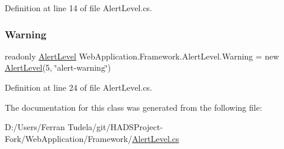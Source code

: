 Definition at line 14 of file Alert\+Level.\+cs.

\mbox{\label{classWebApplication_1_1Framework_1_1AlertLevel_a446058e14c2e46ed2ed3232cb6c6b155}} 
\subsubsection{\texorpdfstring{Warning}{Warning}}
{\footnotesize\ttfamily readonly \mbox{\hyperlink{classWebApplication_1_1Framework_1_1AlertLevel}{Alert\+Level}} Web\+Application.\+Framework.\+Alert\+Level.\+Warning = new \mbox{\hyperlink{classWebApplication_1_1Framework_1_1AlertLevel}{Alert\+Level}}(5, \char`\"{}alert-\/warning\char`\"{})\hspace{0.3cm}{\ttfamily [static]}}



Definition at line 24 of file Alert\+Level.\+cs.



The documentation for this class was generated from the following file\+:\begin{DoxyCompactItemize}
\item 
D\+:/\+Users/\+Ferran Tudela/git/\+H\+A\+D\+S\+Project-\/\+Fork/\+Web\+Application/\+Framework/\mbox{\hyperlink{AlertLevel_8cs}{Alert\+Level.\+cs}}\end{DoxyCompactItemize}
